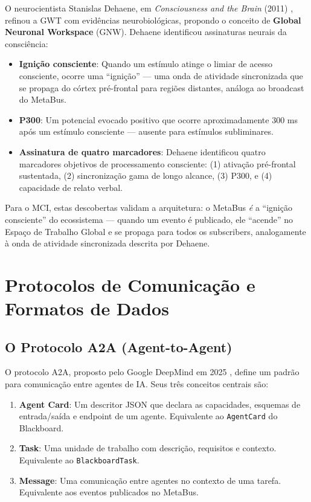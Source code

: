 O neurocientista Stanislas Dehaene, em \textit{Consciousness and the Brain} (2011) \cite{Dehaene2011_Consciousness}, refinou a GWT com evidências neurobiológicas, propondo o conceito de \textbf{Global Neuronal Workspace} (GNW). Dehaene identificou assinaturas neurais da consciência:

\begin{itemize}
    \item \textbf{Ignição consciente}: Quando um estímulo atinge o limiar de acesso consciente, ocorre uma ``ignição'' — uma onda de atividade sincronizada que se propaga do córtex pré-frontal para regiões distantes, análoga ao broadcast do MetaBus.
    \item \textbf{P300}: Um potencial evocado positivo que ocorre aproximadamente 300 ms após um estímulo consciente — ausente para estímulos subliminares.
    \item \textbf{Assinatura de quatro marcadores}: Dehaene identificou quatro marcadores objetivos de processamento consciente: (1) ativação pré-frontal sustentada, (2) sincronização gama de longo alcance, (3) P300, e (4) capacidade de relato verbal.
\end{itemize}

Para o MCI, estas descobertas validam a arquitetura: o MetaBus \textit{é} a ``ignição consciente'' do ecossistema — quando um evento é publicado, ele ``acende'' no Espaço de Trabalho Global e se propaga para todos os subscribers, analogamente à onda de atividade sincronizada descrita por Dehaene.

\section{Protocolos de Comunicação e Formatos de Dados}
\label{sec:protocols}

\subsection{O Protocolo A2A (Agent-to-Agent)}

O protocolo A2A, proposto pelo Google DeepMind em 2025 \cite{Google2025_A2A}, define um padrão para comunicação entre agentes de IA. Seus três conceitos centrais são:

\begin{enumerate}
    \item \textbf{Agent Card}: Um descritor JSON que declara as capacidades, esquemas de entrada/saída e endpoint de um agente. Equivalente ao \texttt{AgentCard} do Blackboard.
    
    \item \textbf{Task}: Uma unidade de trabalho com descrição, requisitos e contexto. Equivalente ao \texttt{BlackboardTask}.
    
    \item \textbf{Message}: Uma comunicação entre agentes no contexto de uma tarefa. Equivalente aos eventos publicados no MetaBus.
\end{enumerate}

